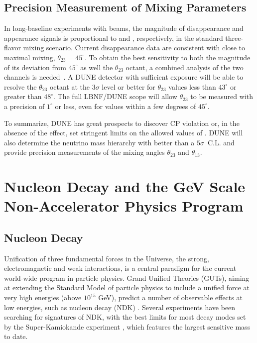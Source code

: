 \subsection{Precision Measurement of Mixing Parameters}

In long-baseline experiments with \numu beams, the
magnitude of \numu disappearance and \nue appearance signals is
proportional to  and ,
respectively, in the standard three-flavor mixing scenario.  Current
\numu disappearance data are consistent with close to maximal
mixing, $\theta_{23} = 45^\circ$.  To obtain the best sensitivity to
both the magnitude of its deviation from $45^\circ$ as well the 
$\theta_{23}$ octant, a combined analysis of the two channels
is needed~\cite{Huber:2010dx}.  A DUNE detector with sufficient exposure will be able to
resolve the $\theta_{23}$ octant at the $3\sigma$ level or better for
$\theta_{23}$ values less than $43^\circ$ or greater than $48^\circ$.
The full LBNF/DUNE scope will allow $\theta_{23}$ to be measured with a precision of
$1^\circ$ or less, even for values within a few degrees of
$45^\circ$. 

To summarize, DUNE has great prospects to discover CP violation or, in the absence of the
effect, set stringent limits on the allowed values of \deltacp. 
DUNE will also determine the neutrino mass hierarchy with better
than a $5\sigma$~C.L. and provide precision measurements
of the mixing angles $\theta_{23}$ and $\theta_{13}$.


\section{Nucleon Decay and the GeV Scale Non-Accelerator Physics Program}

\subsection{Nucleon Decay}

Unification of three fundamental forces in the Universe, the strong, electromagnetic and weak interactions, is a central paradigm for the current world-wide program in particle physics. Grand Unified Theories (GUTs), aiming at extending the Standard Model of particle physics to include a unified force at very high energies  (above $10^{15}$ GeV), predict a number of observable effects at low energies, such as nucleon decay (NDK) \cite{Pati:1973rp,Georgi:1974sy,Dimopoulos:1981dw,Langacker:1980js,deBoer:1994dg,Nath:2006ut}. Several experiments have been searching for signatures of NDK, with the best limits for most decay modes set by the Super-Kamiokande experiment \cite{Nishino:2012bnw}, which features the largest sensitive mass to date. 

